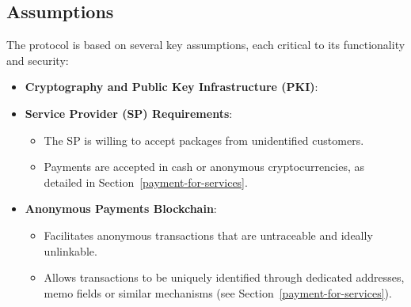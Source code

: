 \documentclass[pdftex,twocolumn,epjc3]{svjour3}
\begin{document}
\subsection{Assumptions}
The protocol is based on several key assumptions, each critical to its functionality and security:

\begin{itemize}
  \item \textbf{Cryptography and Public Key Infrastructure (PKI)}:

\item \textbf{Service Provider (SP) Requirements}:
  \begin{itemize}
      \item The SP is willing to accept packages from unidentified customers.
      \item Payments are accepted in cash or anonymous cryptocurrencies, as detailed in Section~\ref{payment-for-services}.
   \end{itemize}
  
\item \textbf{Anonymous Payments Blockchain}:
  \begin{itemize}
      \item Facilitates anonymous transactions that are untraceable and ideally unlinkable.
      \item Allows transactions to be uniquely identified through dedicated addresses, memo fields or similar mechanisms (see Section~\ref{payment-for-services}).
  \end{itemize}


\end{itemize}
\end{document}
